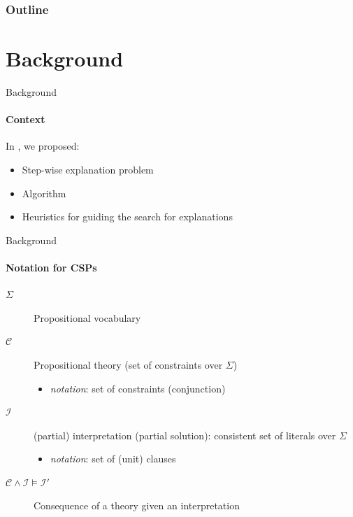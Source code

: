 \documentclass{beamer}
\newcommand\m[1]{\ensuremath{\mathcal{#1}}\xspace}
\renewcommand\emph[1]{{\color{vuborange}#1}}
\begin{document}
	\begin{frame}
		\frametitle{Outline}
		\tableofcontents
	\end{frame}

	\section{Background}
	\begin{frame}{Background}
	\framesubtitle{Context}
	In \cite{bogaerts2020step}, we proposed:\pause

		\begin{itemize}
			\item Step-wise explanation problem
			\item Algorithm 
			\item Heuristics for guiding the search for explanations
		\end{itemize}
		\end{frame}

	\begin{frame}{Background}
	\framesubtitle{Notation for CSPs}
	\begin{description}
		\item[$\Sigma$] Propositional vocabulary%
		\item[$\m{C}$] Propositional theory (set of constraints over $\Sigma$)%
		\begin{itemize}
			\item \textit{\emph{notation}}: set of constraints (conjunction)
		\end{itemize}
		\item[$\m{I}$] (partial) interpretation (partial solution): consistent set of literals over $\Sigma$
		\begin{itemize}
			\item \textit{\emph{notation}}: set of (unit) clauses
		\end{itemize}
		\item[$\m{C} \wedge \m{I} \models \m{I}'$] Consequence of a theory given an interpretation
	\end{description}

	\end{frame}
\end{document}
